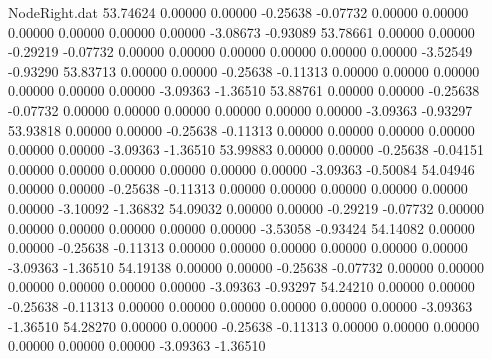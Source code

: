 \begin{filecontents}{NodeRight.dat}
  53.74624    0.00000    0.00000    -0.25638   -0.07732    0.00000    0.00000    0.00000    0.00000    0.00000    0.00000   -3.08673   -0.93089
  53.78661    0.00000    0.00000    -0.29219   -0.07732    0.00000    0.00000    0.00000    0.00000    0.00000    0.00000   -3.52549   -0.93290
  53.83713    0.00000    0.00000    -0.25638   -0.11313    0.00000    0.00000    0.00000    0.00000    0.00000    0.00000   -3.09363   -1.36510
  53.88761    0.00000    0.00000    -0.25638   -0.07732    0.00000    0.00000    0.00000    0.00000    0.00000    0.00000   -3.09363   -0.93297
  53.93818    0.00000    0.00000    -0.25638   -0.11313    0.00000    0.00000    0.00000    0.00000    0.00000    0.00000   -3.09363   -1.36510
  53.99883    0.00000    0.00000    -0.25638   -0.04151    0.00000    0.00000    0.00000    0.00000    0.00000    0.00000   -3.09363   -0.50084
  54.04946    0.00000    0.00000    -0.25638   -0.11313    0.00000    0.00000    0.00000    0.00000    0.00000    0.00000   -3.10092   -1.36832
  54.09032    0.00000    0.00000    -0.29219   -0.07732    0.00000    0.00000    0.00000    0.00000    0.00000    0.00000   -3.53058   -0.93424
  54.14082    0.00000    0.00000    -0.25638   -0.11313    0.00000    0.00000    0.00000    0.00000    0.00000    0.00000   -3.09363   -1.36510
  54.19138    0.00000    0.00000    -0.25638   -0.07732    0.00000    0.00000    0.00000    0.00000    0.00000    0.00000   -3.09363   -0.93297
  54.24210    0.00000    0.00000    -0.25638   -0.11313    0.00000    0.00000    0.00000    0.00000    0.00000    0.00000   -3.09363   -1.36510
  54.28270    0.00000    0.00000    -0.25638   -0.11313    0.00000    0.00000    0.00000    0.00000    0.00000    0.00000   -3.09363   -1.36510
\end{filecontents}

